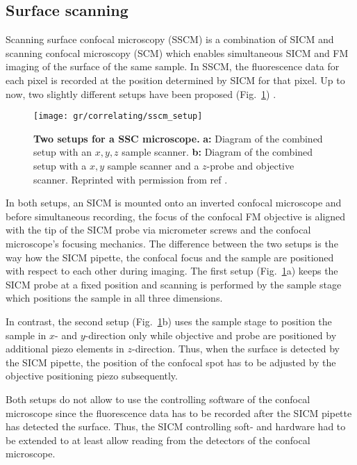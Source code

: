 \subsection{Surface scanning}

Scanning surface confocal microscopy (SSCM) \cite{Gorelik2002a} is a
combination of SICM and scanning confocal microscopy (SCM) which enables
simultaneous SICM and FM imaging of the surface of the same sample. In SSCM,
the fluorescence data for each pixel is recorded at the position determined by
SICM for that pixel. Up to now, two slightly different setups have been proposed
(Fig.~\ref{fig:sscm_setup}) \cite{Gorelik2002a,Shevchuk2013}.

\begin{figure}
  \texttt{[image: gr/correlating/sscm\_setup]}

  \caption{%
    \textbf{Two setups for a SSC microscope.}
    \textbf{a:} Diagram of the combined setup with an $x,y,z$ sample scanner.
    \textbf{b:} Diagram of the combined setup with a $x,y$ sample scanner and
    a $z$-probe and objective scanner. 
    Reprinted with permission from ref \cite{Shevchuk2013}.
  }
  \label{fig:sscm_setup}
\end{figure}

In both setups, an SICM is mounted onto an inverted confocal microscope and
before simultaneous recording, the focus of the confocal FM objective is
aligned with the tip of the SICM probe via micrometer screws and the confocal
microscope's focusing mechanics. The
difference between the two setups is the way how the SICM pipette, the
confocal focus and the sample are positioned with respect to each other during
imaging. The
first setup (Fig.~\ref{fig:sscm_setup}a) keeps the 
SICM probe at a fixed position and scanning is performed by the sample
stage which positions the sample in all three dimensions.

In contrast, the second setup (Fig.~\ref{fig:sscm_setup}b) uses the sample
stage to position the sample in $x$- and $y$-direction only while objective
and probe are positioned by additional piezo elements in $z$-direction. Thus,
when the surface is detected by the SICM pipette,  the position of
the confocal spot has to be adjusted by the objective positioning piezo subsequently.

Both setups do not allow to use the controlling software of the confocal
microscope since the fluorescence data has to be recorded after the SICM
pipette has detected the surface. Thus, the SICM controlling soft- and
hardware had to be extended to at least allow reading from the detectors of
the confocal microscope. 

